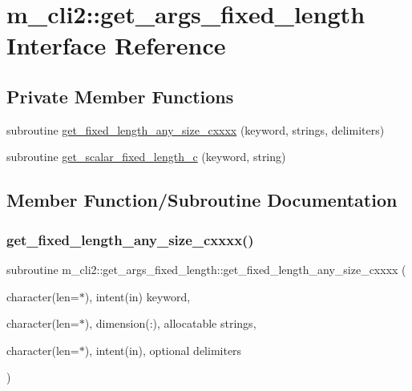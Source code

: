 \hypertarget{interfacem__cli2_1_1get__args__fixed__length}{}\section{m\+\_\+cli2\+:\+:get\+\_\+args\+\_\+fixed\+\_\+length Interface Reference}
\label{interfacem__cli2_1_1get__args__fixed__length}
\subsection*{Private Member Functions}
\begin{DoxyCompactItemize}
\item 
subroutine \mbox{\hyperlink{interfacem__cli2_1_1get__args__fixed__length_ae4ef1709bb95fb60a0252c4e6668f321}{get\+\_\+fixed\+\_\+length\+\_\+any\+\_\+size\+\_\+cxxxx}} (keyword, strings, delimiters)
\item 
subroutine \mbox{\hyperlink{interfacem__cli2_1_1get__args__fixed__length_a3dec369db225fffd4f9d71833686e19a}{get\+\_\+scalar\+\_\+fixed\+\_\+length\+\_\+c}} (keyword, string)
\end{DoxyCompactItemize}


\subsection{Member Function/\+Subroutine Documentation}
\mbox{\label{interfacem__cli2_1_1get__args__fixed__length_ae4ef1709bb95fb60a0252c4e6668f321}} 
\subsubsection{\texorpdfstring{get\+\_\+fixed\+\_\+length\+\_\+any\+\_\+size\+\_\+cxxxx()}{get\_fixed\_length\_any\_size\_cxxxx()}}
{\footnotesize\ttfamily subroutine m\+\_\+cli2\+::get\+\_\+args\+\_\+fixed\+\_\+length\+::get\+\_\+fixed\+\_\+length\+\_\+any\+\_\+size\+\_\+cxxxx (\begin{DoxyParamCaption}\item[{character(len=$\ast$), intent(in)}]{keyword,  }\item[{character(len=$\ast$), dimension(\+:), allocatable}]{strings,  }\item[{character(len=$\ast$), intent(in), optional}]{delimiters }\end{DoxyParamCaption})\hspace{0.3cm}{\ttfamily [private]}}

